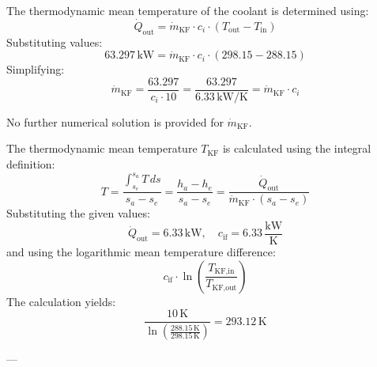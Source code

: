 The thermodynamic mean temperature of the coolant is determined using:  
\[
\dot{Q}_{\text{out}} = \dot{m}_{\text{KF}} \cdot c_i \cdot (T_{\text{out}} - T_{\text{in}})
\]  
Substituting values:  
\[
63.297 \, \text{kW} = \dot{m}_{\text{KF}} \cdot c_i \cdot (298.15 - 288.15)
\]  
Simplifying:  
\[
\dot{m}_{\text{KF}} = \frac{63.297}{c_i \cdot 10} = \frac{63.297}{6.33 \, \text{kW/K}} = \dot{m}_{\text{KF}} \cdot c_i
\]  

No further numerical solution is provided for \( \dot{m}_{\text{KF}} \).

The thermodynamic mean temperature \( T_{\text{KF}} \) is calculated using the integral definition:  
\[
T = \frac{\int_{s_e}^{s_a} T \, ds}{s_a - s_e} = \frac{h_a - h_e}{s_a - s_e} = \frac{\dot{Q}_{\text{out}}}{\dot{m}_{\text{KF}} \cdot (s_a - s_e)}
\]  
Substituting the given values:  
\[
\dot{Q}_{\text{out}} = 6.33 \, \text{kW}, \quad c_{\text{if}} = 6.33 \, \frac{\text{kW}}{\text{K}}
\]  
and using the logarithmic mean temperature difference:  
\[
c_{\text{if}} \cdot \ln \left( \frac{T_{\text{KF,in}}}{T_{\text{KF,out}}} \right)
\]  
The calculation yields:  
\[
\frac{10 \, \text{K}}{\ln \left( \frac{288.15 \, \text{K}}{298.15 \, \text{K}} \right)} = 293.12 \, \text{K}
\]  

---